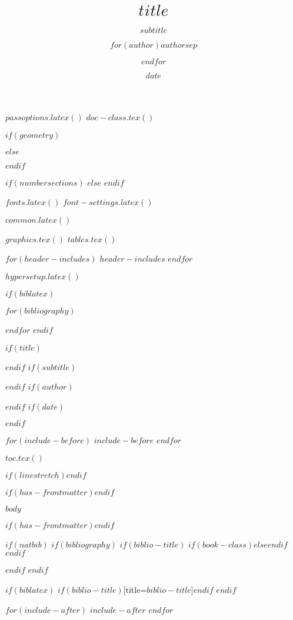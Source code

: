 $passoptions.latex()$
$doc-class.tex()$

\usepackage{xcolor}

$if(geometry)$
\usepackage[$for(geometry)$$geometry$$sep$,$endfor$]{geometry}
$else$
\usepackage[a4paper,margin=2.5cm]{geometry}
$endif$

\usepackage{amsmath,amssymb}

$if(numbersections)$
\setcounter{secnumdepth}{$if(secnumdepth)$$secnumdepth$$else$5$endif$}
$else$
\setcounter{secnumdepth}{-\maxdimen}
$endif$

$fonts.latex()$
$font-settings.latex()$

$common.latex()$

$graphics.tex()$
$tables.tex()$

$for(header-includes)$
$header-includes$
$endfor$

$hypersetup.latex()$

$if(biblatex)$
\usepackage[$if(biblio-style)$style=$biblio-style$,$endif$$for(biblatexoptions)$$biblatexoptions$$sep$,$endfor$]{biblatex}
$for(bibliography)$

$endfor$
$endif$

$if(title)$\title{$title$}$endif$
$if(subtitle)$\subtitle{$subtitle$}$endif$
$if(author)$\author{$for(author)$$author$$sep$ \and $endfor$}$endif$
$if(date)$\date{$date$}$endif$

\providecommand{\tightlist}{\setlength{\itemsep}{0pt}\setlength{\parskip}{0pt}}



$for(include-before)$
$include-before$
$endfor$

$toc.tex()$

$if(linestretch)$$endif$

$if(has-frontmatter)$\mainmatter$endif$

$body$

$if(has-frontmatter)$\backmatter$endif$

$if(natbib)$
$if(bibliography)$
$if(biblio-title)$
$if(book-class)$\renewcommand\bibname{$biblio-title$}$else$\renewcommand\refname{$biblio-title$}$endif$
$endif$

$endif$
$endif$

$if(biblatex)$
\printbibliography$if(biblio-title)$[title=$biblio-title$]$endif$
$endif$

$for(include-after)$
$include-after$
$endfor$

